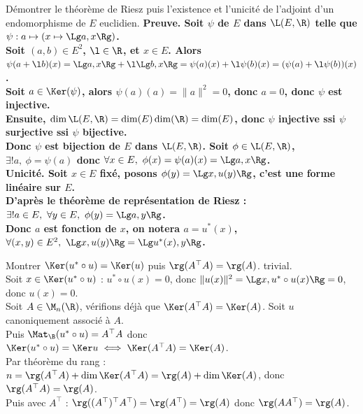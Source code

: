 \documentclass[french, 11pt]{article}
\begin{document}
\begin{question}{}{}
    Démontrer le théorème de Riesz puis l'existence et l'unicité de l'adjoint d'un endomorphisme de $E$ euclidien.
    \tcblower
    \bf{Preuve.} Soit $\psi$ de $E$ dans $\L(E,\R)$ telle que $\psi:a\mapsto(x\mapsto \Lg a,x \Rg)$.\\
    Soit $(a,b)\in E^2$, $\l\in\R$, et $x\in E$. Alors $\psi(a+\l b)(x) = \Lg a, x \Rg + \l \Lg b, x\Rg = \psi(a)(x)+\l\psi(b)(x)=(\psi(a)+\l \psi(b))(x)$. \\
    Soit $a\in\Ker(\psi)$, alors $\psi(a)(a)=\|a\|^2=0$, donc $a=0$, donc $\psi$ est injective.\\
    Ensuite, $\dim \L(E,\R)=\dim(E)\dim(\R)=\dim(E)$, donc $\psi$ injective ssi $\psi$ surjective ssi $\psi$ bijective.\\
    Donc $\psi$ est bijection de $E$ dans $\L(E,\R)$. Soit $\phi\in\L(E,\R)$, $\exists!a,~\phi=\psi(a)$ donc $\forall x\in E, ~ \phi(x)=\psi(a)(x)=\Lg a,x\Rg$.\\
    \bf{Unicité.} Soit $x\in E$ fixé, posons $\phi(y)=\Lg x,u(y)\Rg$, c'est une forme linéaire sur $E$.\\
    D'après le théorème de représentation de Riesz : $\exists!a\in E, ~ \forall y \in E, ~ \phi(y)=\Lg a,y\Rg$.\\
    Donc $a$ est fonction de $x$, on notera $a=u^*(x)$, $\forall (x,y) \in E^2, ~ \Lg x,u(y)\Rg=\Lg u^*(x),y\Rg$.
\end{question}

\begin{question}{}{}
    Montrer $\Ker(u^*\circ u) = \Ker(u)$ puis $\rg(A^\top A) = \rg(A)$.
    \tcblower
     trivial.\\
     Soit $x\in\Ker(u^*\circ u)$ : $u^*\circ u(x)=0$, donc $\|u(x)\|^2=\Lg x, u^*\circ u(x) \Rg = 0$, donc $u(x)=0$.\\
     Soit $A\in\M_n(\R)$, vérifions déjà que $\Ker(A^\top A)=\Ker(A)$. Soit $u$ canoniquement associé à $A$.\\
    Puis $\Mat_\B(u^*\circ u)=A^\top A$ donc $\Ker(u^*\circ u)=\Ker u \iff \Ker(A^\top A) = \Ker(A)$.\\
    Par théorème du rang : $n=\rg(A^\top A)+\dim\Ker(A^\top A)=\rg(A)+\dim\Ker(A)$, donc $\rg(A^\top A)=\rg(A)$.\\
    Puis avec $A^\top$ : $\rg((A^\top)^\top A^\top)=\rg(A^\top)=\rg(A)$ donc $\rg(AA^\top)=\rg(A)$. 
\end{question}
\end{document}
